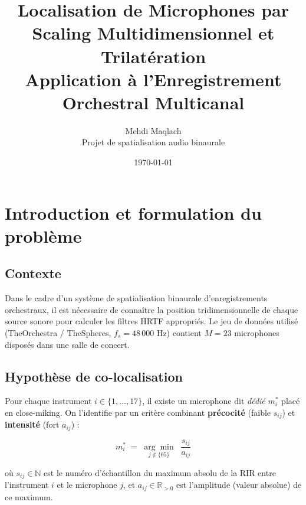 \documentclass[12pt, a4paper]{article}
\title{
    \Large\textbf{Localisation de Microphones par\\
    Scaling Multidimensionnel et Trilatération}\\[0.5em]
    \large Application à l'Enregistrement Orchestral Multicanal
}
\author{
    Mehdi Maqlach\\[0.3em]
    \small Projet de spatialisation audio binaurale
}
\date{\today}
\theoremstyle{plain}
\theoremstyle{definition}
\newcommand{\R}{\mathbb{R}}
\newcommand{\N}{\mathbb{N}}
\begin{document}

\maketitle
\tableofcontents
\newpage

\section{Introduction et formulation du problème}

\subsection{Contexte}

Dans le cadre d'un système de spatialisation binaurale d'enregistrements
orchestraux, il est nécessaire de connaître la position tridimensionnelle de
chaque source sonore pour calculer les filtres HRTF appropriés. Le jeu de
données utilisé (TheOrchestra / TheSpheres, $f_s = 48\,000$ Hz) contient
$M = 23$ microphones disposés dans une salle de concert.

\subsection{Hypothèse de co-localisation}

Pour chaque instrument $i \in \{1, \ldots, 17\}$, il existe un microphone dit
\emph{dédié} $m^*_i$ placé en close-miking. On l'identifie par un critère
combinant \textbf{précocité} (faible $s_{ij}$) et \textbf{intensité} (fort
$a_{ij}$) :

\begin{equation}
    m^*_i \;=\; \underset{j \notin \{05\}}{\arg\min}\;\; \frac{s_{ij}}{a_{ij}}
    \label{eq:dedicated_mic}
\end{equation}

où $s_{ij} \in \N$ est le numéro d'échantillon du maximum absolu de la RIR
entre l'instrument $i$ et le microphone $j$, et $a_{ij} \in \R_{>0}$ est
l'amplitude (valeur absolue) de ce maximum.
\end{document}
